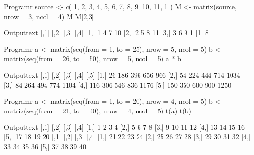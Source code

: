 \begin{code}
    {Program}{r}
source <- c(
  1, 2, 3, 4,
  5, 6, 7, 8,
  9, 10, 11, 1
)
M <- matrix(source, nrow = 3, ncol = 4)
M
M[2,3]
\end{code}
\begin{code}
    {Output}{text}
     [,1] [,2] [,3] [,4]
[1,]    1    4    7   10
[2,]    2    5    8   11
[3,]    3    6    9    1
[1] 8
\end{code}

\begin{code}
    {Program}{r}
a <- matrix(seq(from = 1, to = 25), nrow = 5, ncol = 5)
b <- matrix(seq(from = 26, to = 50), nrow = 5, ncol = 5)
a * b
\end{code}
\begin{code}
    {Output}{text}
     [,1] [,2] [,3] [,4] [,5]
[1,]   26  186  396  656  966
[2,]   54  224  444  714 1034
[3,]   84  264  494  774 1104
[4,]  116  306  546  836 1176
[5,]  150  350  600  900 1250
\end{code}
\newpage
\pagestyle{fancy}

\begin{code}
    {Program}{r}
a <- matrix(seq(from = 1, to = 20), nrow = 4, ncol = 5)
b <- matrix(seq(from = 21, to = 40), nrow = 4, ncol = 5)
t(a)
t(b)
\end{code}
\begin{code}
    {Output}{text}
     [,1] [,2] [,3] [,4]
[1,]    1    2    3    4
[2,]    5    6    7    8
[3,]    9   10   11   12
[4,]   13   14   15   16
[5,]   17   18   19   20
     [,1] [,2] [,3] [,4]
[1,]   21   22   23   24
[2,]   25   26   27   28
[3,]   29   30   31   32
[4,]   33   34   35   36
[5,]   37   38   39   40
\end{code}

